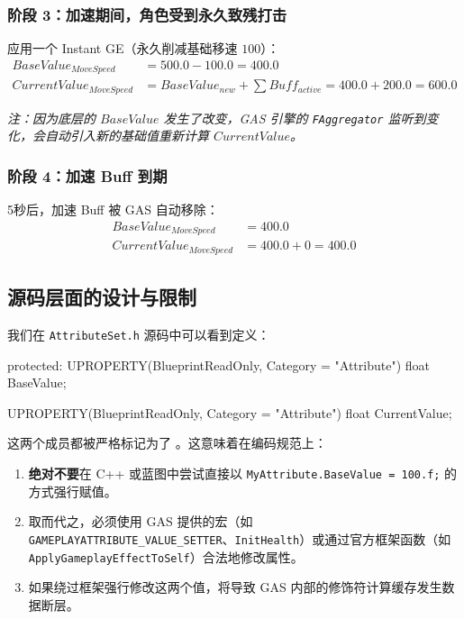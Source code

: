 \subsubsection{阶段 3：加速期间，角色受到永久致残打击}
应用一个 Instant GE（永久削减基础移速 $100$）：
\begin{align*}
	BaseValue_{MoveSpeed} &= 500.0 - 100.0 = 400.0 \\
	CurrentValue_{MoveSpeed} &= BaseValue_{new} + \sum Buff_{active} = 400.0 + 200.0 = 600.0
\end{align*}
\begin{marker}
	\textit{注：因为底层的 $BaseValue$ 发生了改变，GAS 引擎的 \texttt{FAggregator} 监听到变化，会自动引入新的基础值重新计算 $CurrentValue$。}
\end{marker}

\subsubsection{阶段 4：加速 Buff 到期}
5秒后，加速 Buff 被 GAS 自动移除：
\begin{align*}
	BaseValue_{MoveSpeed} &= 400.0 \\
	CurrentValue_{MoveSpeed} &= 400.0 + 0 = 400.0
\end{align*}

\subsection{源码层面的设计与限制}
我们在 \texttt{AttributeSet.h} 源码中可以看到定义：

\begin{code}
	protected:
	UPROPERTY(BlueprintReadOnly, Category = "Attribute")
	float BaseValue;
	
	UPROPERTY(BlueprintReadOnly, Category = "Attribute")
	float CurrentValue;
\end{code}
这两个成员都被严格标记为了 。这意味着在编码规范上：
\begin{enumerate}
	\item \textbf{绝对不要}在 C++ 或蓝图中尝试直接以 \texttt{MyAttribute.BaseValue = 100.f;} 的方式强行赋值。
	\item 取而代之，必须使用 GAS 提供的宏（如 \texttt{GAMEPLAYATTRIBUTE\_VALUE\_SETTER}、\texttt{InitHealth}）或通过官方框架函数（如 \texttt{ApplyGameplayEffectToSelf}）合法地修改属性。
	\item 如果绕过框架强行修改这两个值，将导致 GAS 内部的修饰符计算缓存发生数据断层。
\end{enumerate}




